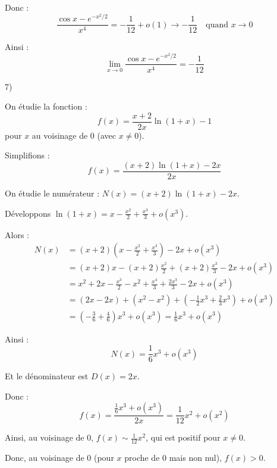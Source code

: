 Donc :
\[
\frac{\cos x - e^{-x^2/2}}{x^4} = -\frac{1}{12} + o(1) \to -\frac{1}{12} \quad \text{quand } x \to 0
\]

Ainsi :
\[
\lim_{x \to 0} \frac{\cos x - e^{-x^2/2}}{x^4} = -\frac{1}{12}
\]

7)

On étudie la fonction :
\[
f(x) = \frac{x+2}{2x} \ln(1+x) - 1
\]
pour $x$ au voisinage de 0 (avec $x \neq 0$).

Simplifions :
\[
f(x) = \frac{(x+2) \ln(1+x) - 2x}{2x}
\]

On étudie le numérateur : $N(x) = (x+2) \ln(1+x) - 2x$.

Développons $\ln(1+x) = x - \frac{x^2}{2} + \frac{x^3}{3} + o(x^3)$.

Alors :
\begin{align*}
N(x) &= (x+2) \left(x - \frac{x^2}{2} + \frac{x^3}{3}\right) - 2x + o(x^3) \\
&= (x+2)x - (x+2)\frac{x^2}{2} + (x+2)\frac{x^3}{3} - 2x + o(x^3) \\
&= x^2 + 2x - \frac{x^3}{2} - x^2 + \frac{x^4}{3} + \frac{2x^3}{3} - 2x + o(x^3) \\
&= (2x - 2x) + (x^2 - x^2) + \left(-\frac{1}{2} x^3 + \frac{2}{3} x^3\right) + o(x^3) \\
&= \left(-\frac{3}{6} + \frac{4}{6}\right) x^3 + o(x^3) = \frac{1}{6} x^3 + o(x^3)
\end{align*}

Ainsi :
\[
N(x) = \frac{1}{6} x^3 + o(x^3)
\]

Et le dénominateur est $D(x) = 2x$.

Donc :
\[
f(x) = \frac{\frac{1}{6} x^3 + o(x^3)}{2x} = \frac{1}{12} x^2 + o(x^2)
\]

Ainsi, au voisinage de 0, $f(x) \sim \frac{1}{12} x^2$, qui est positif pour $x \neq 0$.

Donc, au voisinage de 0 (pour $x$ proche de 0 mais non nul), $f(x) > 0$.



